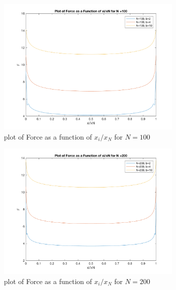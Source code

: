 \documentclass[paper=a4, fontsize=12pt]{scrartcl} %
\numberwithin{equation}{section}       %
\numberwithin{figure}{section}         %
\numberwithin{table}{section}          %
\begin{document}
\begin{figure}[h!]
  \centering
  \includegraphics[width=0.8\textwidth]{Plot_of_Force_N100.png}
  \caption{plot of Force as a function of $x_i/x_N$ for $N=100$}
  \label{fig:Fplot1}
\end{figure}

\begin{figure}[h!]
  \centering
  \includegraphics[width=0.8\textwidth]{Plot_of_Force_N200.png}
  \caption{plot of Force as a function of $x_i/x_N$ for $N=200$}
  \label{fig:Fplot2}
\end{figure}
\end{document}
